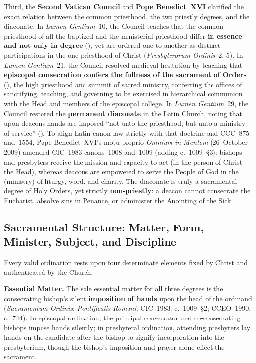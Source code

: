 Third, the \textbf{Second Vatican Council} and \textbf{Pope Benedict~XVI} clarified the exact relation between the common priesthood, the two priestly degrees, and the diaconate. In \emph{Lumen Gentium}~10, the Council teaches that the common priesthood of all the baptized and the ministerial priesthood differ \textbf{in essence and not only in degree} (), yet are ordered one to another as distinct participations in the one priesthood of Christ (\emph{Presbyterorum Ordinis}~2, 5). In \emph{Lumen Gentium}~21, the Council resolved medieval hesitation by teaching that \textbf{episcopal consecration confers the fullness of the sacrament of Orders} (), the high priesthood and summit of sacred ministry, conferring the offices of sanctifying, teaching, and governing to be exercised in hierarchical communion with the Head and members of the episcopal college. In \emph{Lumen Gentium}~29, the Council restored the \textbf{permanent diaconate} in the Latin Church, noting that upon deacons hands are imposed ``not unto the priesthood, but unto a ministry of service'' (). To align Latin canon law strictly with that doctrine and CCC~875 and~1554, Pope Benedict~XVI's motu proprio \emph{Omnium in Mentem} (26~October 2009) amended CIC~1983 canons~1008 and~1009 (adding c.~1009~\S3): bishops and presbyters receive the mission and capacity to act  (in the person of Christ the Head), whereas deacons are empowered to serve the People of God in the  (ministry) of liturgy, word, and charity. The diaconate is truly a sacramental degree of Holy Orders, yet strictly \textbf{non-priestly}: a deacon cannot consecrate the Eucharist, absolve sins in Penance, or administer the Anointing of the Sick.

\subsection{Sacramental Structure: Matter, Form, Minister, Subject, and Discipline}
\label{subsec:orders-structure}

Every valid ordination rests upon four determinate elements fixed by Christ and authenticated by the Church.

\textbf{Essential Matter.} The sole essential matter for all three degrees is the consecrating bishop's silent \textbf{imposition of hands} upon the head of the ordinand (\emph{Sacramentum Ordinis}; \emph{Pontificalis Romani}; CIC~1983, c.~1009~\S2; CCEO~1990, c.~744). In episcopal ordination, the principal consecrator and co-consecrating bishops impose hands silently; in presbyteral ordination, attending presbyters lay hands on the candidate after the bishop to signify incorporation into the presbyterium, though the bishop's imposition and prayer alone effect the sacrament.

